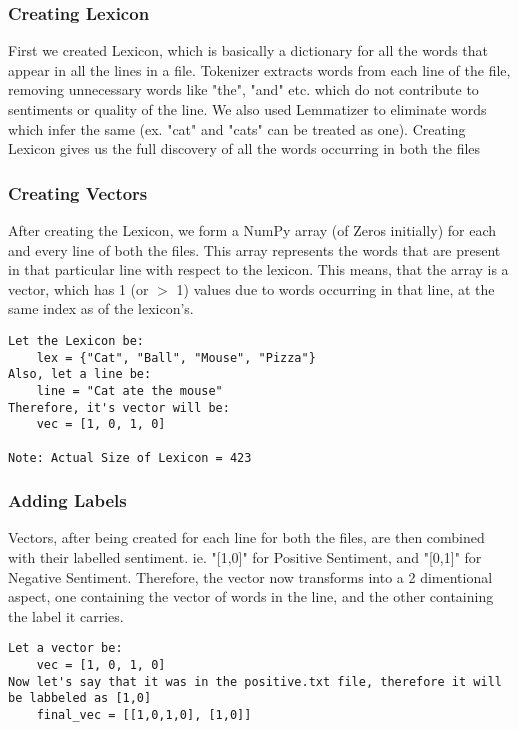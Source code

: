 \subsubsection{Creating Lexicon}
First we created Lexicon, which is basically a dictionary for all the words that appear in all the lines in a file. Tokenizer extracts words from each line of the file, removing unnecessary words like "the", "and" etc. which do not contribute to sentiments or quality of the line. We also used Lemmatizer to eliminate words which infer the same (ex. "cat" and "cats" can be treated as one). Creating Lexicon gives us the full discovery of all the words occurring in both the files

\subsubsection{Creating Vectors}
After creating the Lexicon, we form a NumPy array (of Zeros initially) for each and every line of both the files. This array represents the words that are present in that particular line with respect to the lexicon. This means, that the array is a vector, which has 1 (or $>$ 1) values due to words occurring in that line, at the same index as of the lexicon's.

\begin{verbatim}
Let the Lexicon be:
    lex = {"Cat", "Ball", "Mouse", "Pizza"}
Also, let a line be:
    line = "Cat ate the mouse"
Therefore, it's vector will be:
    vec = [1, 0, 1, 0]

Note: Actual Size of Lexicon = 423
\end{verbatim}

\subsubsection{Adding Labels}
Vectors, after being created for each line for both the files, are then combined with their labelled sentiment. ie. "[1,0]" for Positive Sentiment, and "[0,1]" for Negative Sentiment.
Therefore, the vector now transforms into a 2 dimentional aspect, one containing the vector of words in the line, and the other containing the label it carries.

\begin{verbatim}
Let a vector be:
    vec = [1, 0, 1, 0]
Now let's say that it was in the positive.txt file, therefore it will be labbeled as [1,0]
    final_vec = [[1,0,1,0], [1,0]]
\end{verbatim}

